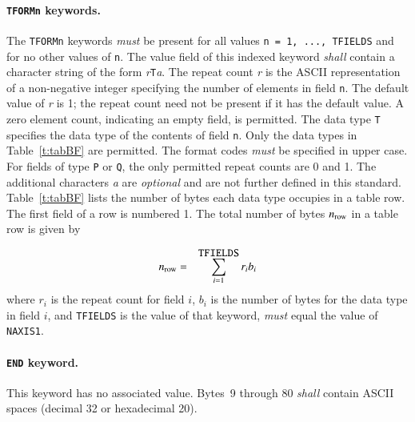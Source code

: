 \documentclass[onecolumn]{aa}
\begin{document}
   \paragraph{{\tt TFORMn} keywords.}
 The {\tt TFORMn} keywords {\em must} be present for all values 
 {\tt n = 1, ..., TFIELDS} and for no other values of {\tt n}.
 The value field of this indexed keyword {\em shall} contain a
 character string of the form {\em r}{\tt T}{\em a}.  
 The repeat count {\em r} is
 the ASCII representation of a non-negative integer 
 specifying the number of elements in field {\tt n}.
 The default value of {\em r} is 1; the repeat count need not be present
 if it has the default value.  A zero element count, indicating an              
 empty field, is permitted.
 The data type {\tt T} specifies the data type of the contents of field
 {\tt n}.  Only the data types in Table~\ref{t:tabBF} are permitted. 
 The format codes {\em must} be specified in upper case.  For
 fields of type {\tt P} or {\tt Q}, the only permitted repeat counts are 0 and 1. The
 additional characters {\em a} are {\em optional}  and are not further defined
 in this standard.  Table~\ref{t:tabBF} lists the number of bytes each
 data type occupies in a table row. The first field of a row is
 numbered 1. The total number of bytes $n_{\rm row}$ 
 in a table row is given by

\begin{eqnarray}                                      
   n_{\rm row} & = & \sum_{i=1}^{\mbox{\tt TFIELDS}} {r_{i} b_{i}}
\label{eq:binrow}
\end{eqnarray}
 where $r_{i}$ is the repeat count for field $i$, $b_{i}$ is the 
 number of bytes for the data type in field $i$, and {\tt TFIELDS}
 is the value of that keyword, 
 {\em must} equal the value of {\tt NAXIS1}.
 


   \paragraph{{\tt END} keyword.}
 This keyword has no associated value.  Bytes~9 through 80
 {\em shall} contain ASCII spaces (decimal 32 or hexadecimal 20).
  
\end{document}
